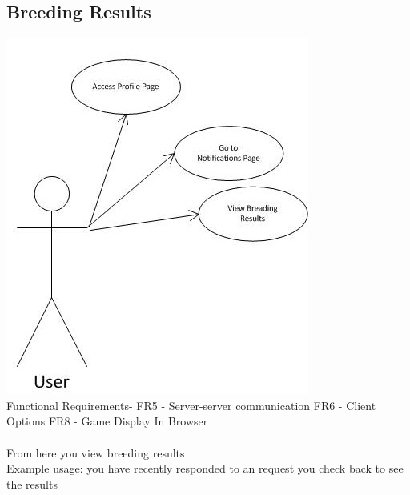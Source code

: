 \documentclass{project}
\begin{document}
\subsection{Breeding Results}
\includegraphics[scale=0.6]{BreedingResultsPageUseCase.jpg}
\\
Functional Requirements-
FR5 - Server-server communication
FR6 - Client Options
FR8 - Game Display In Browser
\\
\\
From here you view breeding results
\\
Example usage: you have recently responded to an request you check back to see the results

\newpage
\end{document}
